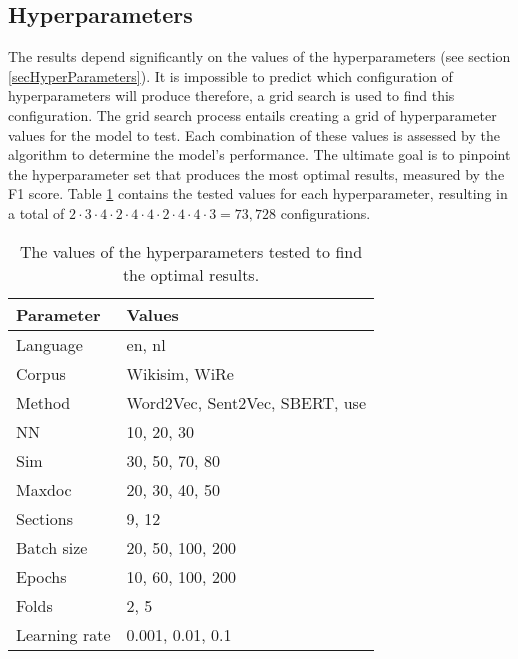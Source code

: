 \subsection{Hyperparameters}
The results depend significantly on the values of the hyperparameters (see section \ref{secHyperParameters}). It is impossible to predict which configuration of hyperparameters will produce therefore, a grid search is used to find this configuration. The grid search process entails creating a grid of hyperparameter values for the model to test. Each combination of these values is assessed by the algorithm to determine the model's performance. The ultimate goal is to pinpoint the hyperparameter set that produces the most optimal results, measured by the F1 score. Table \ref{tabTestedParameters} contains the tested values for each hyperparameter, resulting in a total of $2 \cdot 3  \cdot 4  \cdot 2  \cdot 4  \cdot 4  \cdot  2  \cdot  4\cdot4  \cdot  3 = 73,728$ configurations. \\
 

\begin{table}[!ht]
    \centering
    \captionsetup{justification=centering}
    \begin{tabular}{l|l}
    \hline
        \textbf{Parameter} & \textbf{Values} \\ \hline
        Language & en, nl\\ \hline
        Corpus & Wikisim, WiRe\\ \hline
        Method & Word2Vec, Sent2Vec, SBERT, use\\ \hline
        NN & 10, 20, 30\\ \hline
        Sim & 30, 50, 70, 80\\ \hline
        Maxdoc & 20, 30, 40, 50\\ \hline
        Sections & 9, 12\\ \hline
        Batch size & 20, 50, 100, 200 \\ \hline
        Epochs & 10, 60, 100, 200\\ \hline
        Folds & 2, 5 \\ \hline
        Learning rate & 0.001, 0.01, 0.1\\ \hline
    \end{tabular}
    \caption{The values of the hyperparameters tested to find the optimal results.}
    \label{tabTestedParameters}
\end{table}

